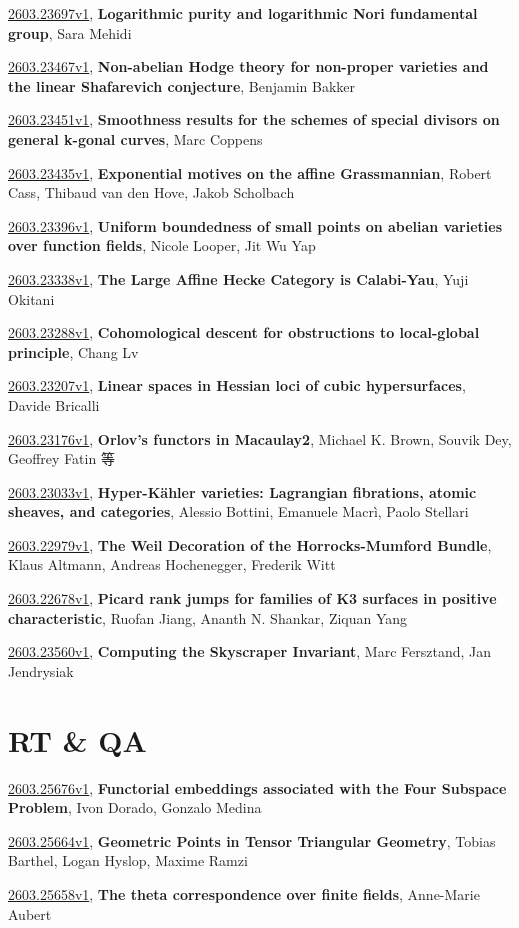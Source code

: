 \documentclass[9pt, a4paper]{article}
\theoremstyle{plain}
\theoremstyle{definition}
\theoremstyle{remark}
\newcommand{\arxiv}[3]{\href{https://arxiv.org/abs/#1}{#1}, \textbf{\textcolor{arxivblue}{#2}}, #3}
\begin{document}
\arxiv{2603.23697v1}{Logarithmic purity and logarithmic Nori fundamental group}{Sara Mehidi}

\arxiv{2603.23467v1}{Non-abelian Hodge theory for non-proper varieties and the linear Shafarevich conjecture}{Benjamin Bakker}

\arxiv{2603.23451v1}{Smoothness results for the schemes of special divisors on general k-gonal curves}{Marc Coppens}

\arxiv{2603.23435v1}{Exponential motives on the affine Grassmannian}{Robert Cass, Thibaud van den Hove, Jakob Scholbach}

\arxiv{2603.23396v1}{Uniform boundedness of small points on abelian varieties over function fields}{Nicole Looper, Jit Wu Yap}

\arxiv{2603.23338v1}{The Large Affine Hecke Category is Calabi-Yau}{Yuji Okitani}

\arxiv{2603.23288v1}{Cohomological descent for obstructions to local-global principle}{Chang Lv}

\arxiv{2603.23207v1}{Linear spaces in Hessian loci of cubic hypersurfaces}{Davide Bricalli}

\arxiv{2603.23176v1}{Orlov's functors in Macaulay2}{Michael K. Brown, Souvik Dey, Geoffrey Fatin 等}

\arxiv{2603.23033v1}{Hyper-Kähler varieties: Lagrangian fibrations, atomic sheaves, and categories}{Alessio Bottini, Emanuele Macrì, Paolo Stellari}

\arxiv{2603.22979v1}{The Weil Decoration of the Horrocks-Mumford Bundle}{Klaus Altmann, Andreas Hochenegger, Frederik Witt}

\arxiv{2603.22678v1}{Picard rank jumps for families of K3 surfaces in positive characteristic}{Ruofan Jiang, Ananth N. Shankar, Ziquan Yang}

\arxiv{2603.23560v1}{Computing the Skyscraper Invariant}{Marc Fersztand, Jan Jendrysiak}


\section{RT \& QA}
\arxiv{2603.25676v1}{Functorial embeddings associated with the Four Subspace Problem}{Ivon Dorado, Gonzalo Medina}

\arxiv{2603.25664v1}{Geometric Points in Tensor Triangular Geometry}{Tobias Barthel, Logan Hyslop, Maxime Ramzi}

\arxiv{2603.25658v1}{The theta correspondence over finite fields}{Anne-Marie Aubert}
\end{document}
